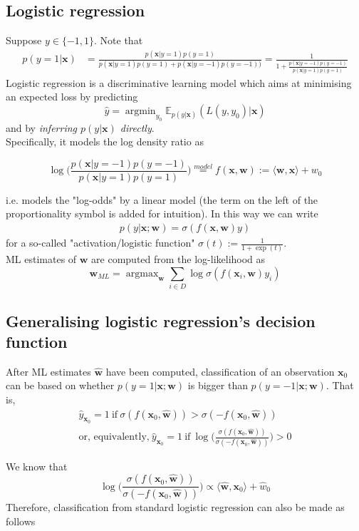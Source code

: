 \documentclass[]{article}
\newcommand{\w}{\mathbf{w}}
\newcommand{\x}{\mathbf{x}}
\begin{document}
\subsection{Logistic regression}


Suppose $y\in \{-1,1\}$. Note that
\begin{align}
p(y=1|\x)&=\frac{p(\x|y=1)p(y=1)}{p(\x|y=1)p(y=1)+p(\x|y=-1)p(y=-1))} = \frac{1}{1+\frac{p(\x|y=-1)p(y=-1)}{p(\x|y=1)p(y=1)}}
\end{align}
Logistic regression is a discriminative learning model which aims at minimising an expected loss by predicting 
$$\hat{y}=\operatorname{argmin}_{y_0}\mathbb{E}_{p(y|\x)}(L(y,y_0)|\x)$$
and by \textit{inferring $p(y|\x)$ directly}. \\


Specifically, it models the log density ratio as 

$$\log\Big(\frac{p(\x|y=-1)p(y=-1)}{p(\x|y=1)p(y=1)}\Big)\overset{model}{=}f(\x,\w):=\langle \w,\x \rangle+w_0$$ 

i.e. models the "log-odds"  by a linear model (the term on the left of the proportionality symbol is added for intuition). In this way we can write 
\begin{align}
p(y|\x;\w)=\sigma(f(\x,\w)y)
\end{align}
for a so-called "activation/logistic function" $\sigma(t):=\frac{1}{1+\exp(t)}$.  \\
ML estimates of $\w$ are computed from the log-likelihood as $$\w_{ML}=\operatorname{argmax}_\w\sum_{i\in D}\log\sigma(f(\x_i,\w)y_i)$$

\subsection{Generalising logistic regression's decision function}
\label{app:decision function}

After ML estimates $\hat{\w}$ have been computed, classification of an observation $\x_0$ can be based on whether $p(y=1|\x;\w)$ is bigger than $p(y=-1|\x;\w)$. That is,
\begin{align*}
\hat{y}_{\x_0}=1 \ \text{if} \ \sigma(f(\x_0,\hat{\w}))>\sigma(-f(\x_0,\hat{\w})) \\
\text{or, equivalently,} \
\hat{y}_{\x_0}=1  \ \text{if} \ \log \Big( \frac{\sigma(f(\x_0,\hat{\w}))}{\sigma(-f(\x_0,\hat{\w}))}\Big)>0
\end{align*} 

We know that $$\log \Big( \frac{\sigma(f(\x_0,\hat{\w}))}{\sigma(-f(\x_0,\hat{\w}))}\Big)\propto \langle\hat{\w},\x_0\rangle+\hat{w}_0$$
Therefore, classification from standard logistic regression can also be made as follows
\end{document}
